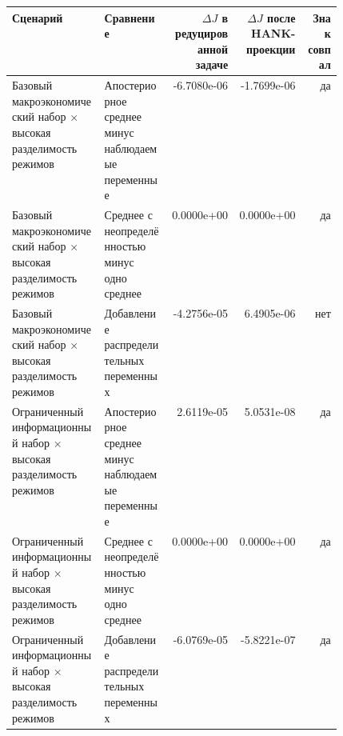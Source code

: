 \begin{tabular}{p{0.28\linewidth}p{0.20\linewidth}rrr}
\toprule
Сценарий & Сравнение & $\Delta J$ в редуцированной задаче & $\Delta J$ после HANK-проекции & Знак совпал \\
\midrule
Базовый макроэкономический набор × высокая разделимость режимов & Апостериорное среднее минус наблюдаемые переменные & -6.7080e-06 & -1.7699e-06 & да \\
Базовый макроэкономический набор × высокая разделимость режимов & Среднее с неопределённостью минус одно среднее & 0.0000e+00 & 0.0000e+00 & да \\
Базовый макроэкономический набор × высокая разделимость режимов & Добавление распределительных переменных & -4.2756e-05 & 6.4905e-06 & нет \\
Ограниченный информационный набор × высокая разделимость режимов & Апостериорное среднее минус наблюдаемые переменные & 2.6119e-05 & 5.0531e-08 & да \\
Ограниченный информационный набор × высокая разделимость режимов & Среднее с неопределённостью минус одно среднее & 0.0000e+00 & 0.0000e+00 & да \\
Ограниченный информационный набор × высокая разделимость режимов & Добавление распределительных переменных & -6.0769e-05 & -5.8221e-07 & да \\
\bottomrule
\end{tabular}